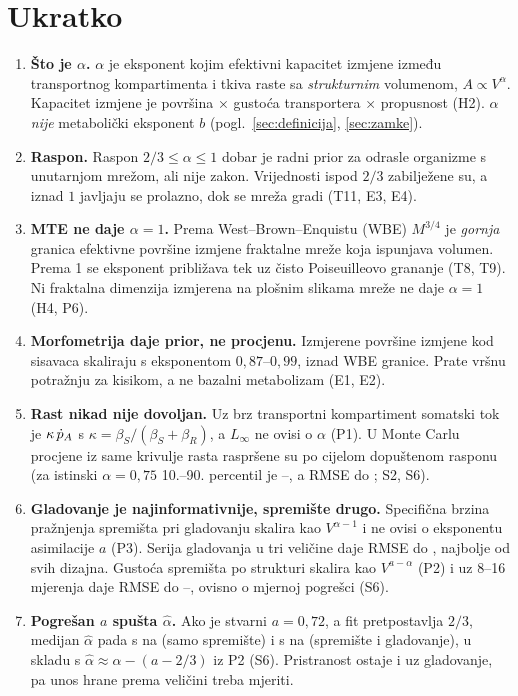 \section{Ukratko}

\begin{kljucno}
\begin{enumerate}[leftmargin=1.6em]
\item \textbf{Što je $\alpha$.} $\alpha$ je eksponent kojim efektivni kapacitet izmjene između transportnog kompartimenta i tkiva raste sa \emph{strukturnim} volumenom, $A\propto V^{\alpha}$. Kapacitet izmjene je površina × gustoća transportera × propusnost (H2). $\alpha$ \emph{nije} metabolički eksponent $b$ (pogl.~\ref{sec:definicija}, \ref{sec:zamke}).
\item \textbf{Raspon.} Raspon $2/3\le\alpha\le1$ dobar je radni prior za odrasle organizme s unutarnjom mrežom, ali nije zakon. Vrijednosti ispod $2/3$ zabilježene su, a iznad $1$ javljaju se prolazno, dok se mreža gradi (T11, E3, E4).
\item \textbf{MTE ne daje $\alpha=1$.} Prema West–Brown–Enquistu (WBE) $M^{3/4}$ je \emph{gornja} granica efektivne površine izmjene fraktalne mreže koja ispunjava volumen. Prema 1 se eksponent približava tek uz čisto Poiseuilleovo grananje (T8, T9). Ni fraktalna dimenzija izmjerena na plošnim slikama mreže ne daje $\alpha=1$ (H4, P6).
\item \textbf{Morfometrija daje prior, ne procjenu.} Izmjerene površine izmjene kod sisavaca skaliraju s eksponentom $0{,}87$–$0{,}99$, iznad WBE granice. Prate vršnu potražnju za kisikom, a ne bazalni metabolizam (E1, E2).
\item \textbf{Rast nikad nije dovoljan.} Uz brz transportni kompartiment somatski tok je $\kappa\,\dot{p}_A$ s $\kappa=\beta_S/(\beta_S+\beta_R)$, a $L_\infty$ ne ovisi o $\alpha$ (P1). U Monte Carlu procjene iz same krivulje rasta raspršene su po cijelom dopuštenom rasponu (za istinski $\alpha=0{,}75$ 10.–90. percentil je \MCAsevenfiveLo–\MCAsevenfiveHi, a RMSE do \MCArmse; S2, S6).
\item \textbf{Gladovanje je najinformativnije, spremište drugo.} Specifična brzina pražnjenja spremišta pri gladovanju skalira kao $V^{\alpha-1}$ i ne ovisi o eksponentu asimilacije $a$ (P3). Serija gladovanja u tri veličine daje RMSE do \MCErmse, najbolje od svih dizajna. Gustoća spremišta po strukturi skalira kao $V^{a-\alpha}$ (P2) i uz 8–16 mjerenja daje RMSE do \MCBrmse–\MCCrmse{}, ovisno o mjernoj pogrešci (S6).
\item \textbf{Pogrešan $a$ spušta $\hat\alpha$.} Ako je stvarni $a=0{,}72$, a fit pretpostavlja $2/3$, medijan $\hat\alpha$ pada s \MCCokMed{} na \MCCmisMed{} (samo spremište) i s \MCFokMed{} na \MCFmisMed{} (spremište i gladovanje), u skladu s $\hat\alpha\approx\alpha-(a-2/3)$ iz P2 (S6). Pristranost ostaje i uz gladovanje, pa unos hrane prema veličini treba mjeriti.

\end{enumerate}
\end{kljucno}
